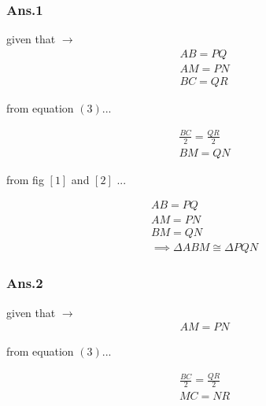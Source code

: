 \documentclass{beamer}
\begin{document}
        
        \begin{frame}
        	\frametitle{Ans.1}
        	given that $\to$\\
        	
        	\begin{align}
        		AB = PQ\\
        		AM = PN\\
        		BC = QR	
        	\end{align}
        	
        	from equation $\left(3\right)$...
        	
        	\begin{align}
        		\frac{BC}{2} = \frac{QR}{2} \\
        		BM = QN
        	\end{align}
       	\end{frame}
       
       \begin{frame}
       		from fig $\left[1\right]$ and $\left[2\right]$ ...
       	
       		\begin{align}
       			AB = PQ\\
       			AM = PN\\
       			BM = QN\\
       			\implies  \Delta ABM \cong \Delta PQN
       		\end{align}
       \end{frame}
       	
       	\begin{frame}
       		\frametitle{Ans.2}
       		given that $\to$\\
       		\begin{align}
       			AM = PN
       		\end{align}
       		
       		from equation $\left(3\right)$...
       		
       		\begin{align}
       			\frac{BC}{2} = \frac{QR}{2} \\
       			MC = NR
       		\end{align}	
       	\end{frame}
       
\end{document}
